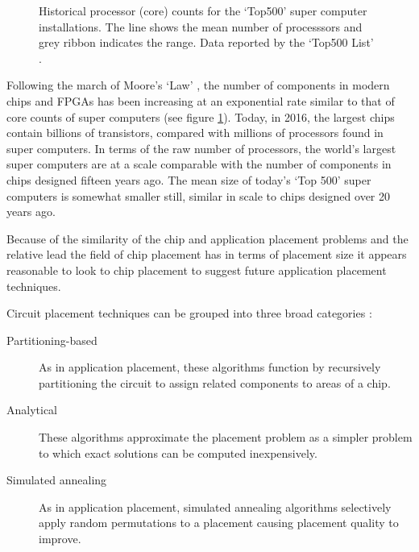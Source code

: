 			\begin{figure}
				\center
				
				\caption[Historical core counts for the `Top500' super computers.]%
				{Historical processor (core) counts for the `Top500' super
				computer installations. The line shows the mean number of processsors and
				grey ribbon indicates the range. Data reported by the `Top500 List'
				\cite{meuer16j}.}
				\label{fig:top500-num-processors}
			\end{figure}
			
			Following the march of Moore's `Law' \cite{moore75}, the number of
			components in modern chips and FPGAs has been increasing at an
			exponential rate similar to that of core counts of super computers (see
			figure \ref{fig:top500-num-processors}). Today, in 2016, the largest
			chips contain billions of transistors, compared with millions of
			processors found in super computers. In terms of the raw number of
			processors, the world's largest super computers are at a scale comparable
			with the number of components in chips designed fifteen years ago. The
			mean size of today's `Top 500' super computers is somewhat smaller still,
			similar in scale to chips designed over 20 years ago.
			
			Because of the similarity of the chip and application placement problems
			and the relative lead the field of chip placement has in terms of
			placement size it appears reasonable to look to chip placement to suggest
			future application placement techniques.
			
			Circuit placement techniques can be grouped into three broad categories
			\cite{kahng11}:
			
			\begin{description}
				
				\item[Partitioning-based] As in application placement, these algorithms
				function by recursively partitioning the circuit to assign
				related components to areas of a chip.
				
				\item[Analytical] These algorithms approximate the placement problem as
				a simpler problem to which exact solutions can be computed
				inexpensively.
				
				\item[Simulated annealing] As in application placement, simulated
				annealing algorithms selectively apply random permutations to a
				placement causing placement quality to improve.
				
			\end{description}
			
